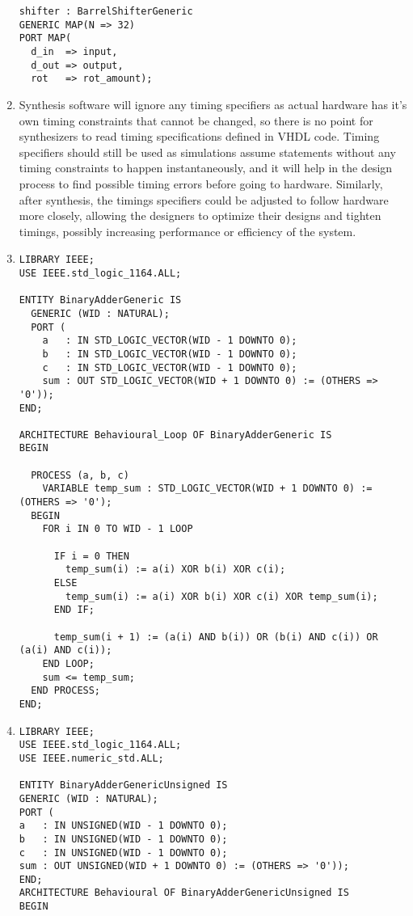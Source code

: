 \documentclass{article}
\begin{document}
\begin{enumerate}
        \begin{verbatim}
shifter : BarrelShifterGeneric
GENERIC MAP(N => 32)
PORT MAP(
  d_in  => input,
  d_out => output,
  rot   => rot_amount);
            \end{verbatim}

  \item Synthesis software will ignore any timing specifiers as actual hardware has it's own timing constraints that cannot be changed, so there is no point for synthesizers to read timing specifications defined in VHDL code.
        Timing specifiers should still be used as simulations assume statements without any timing constraints to happen instantaneously, and it will help in the design process to find possible timing errors before going to hardware.
        Similarly, after synthesis, the timings specifiers could be adjusted to follow hardware more closely, allowing the designers to optimize their designs and tighten timings, possibly increasing performance or efficiency of the system.

  \item \begin{verbatim}
LIBRARY IEEE;
USE IEEE.std_logic_1164.ALL;

ENTITY BinaryAdderGeneric IS
  GENERIC (WID : NATURAL);
  PORT (
    a   : IN STD_LOGIC_VECTOR(WID - 1 DOWNTO 0);
    b   : IN STD_LOGIC_VECTOR(WID - 1 DOWNTO 0);
    c   : IN STD_LOGIC_VECTOR(WID - 1 DOWNTO 0);
    sum : OUT STD_LOGIC_VECTOR(WID + 1 DOWNTO 0) := (OTHERS => '0'));
END;

ARCHITECTURE Behavioural_Loop OF BinaryAdderGeneric IS
BEGIN

  PROCESS (a, b, c)
    VARIABLE temp_sum : STD_LOGIC_VECTOR(WID + 1 DOWNTO 0) := (OTHERS => '0');
  BEGIN
    FOR i IN 0 TO WID - 1 LOOP

      IF i = 0 THEN
        temp_sum(i) := a(i) XOR b(i) XOR c(i);
      ELSE
        temp_sum(i) := a(i) XOR b(i) XOR c(i) XOR temp_sum(i);
      END IF;

      temp_sum(i + 1) := (a(i) AND b(i)) OR (b(i) AND c(i)) OR (a(i) AND c(i));
    END LOOP;
    sum <= temp_sum;
  END PROCESS;
END;
  \end{verbatim}

  \item  \begin{verbatim}
LIBRARY IEEE;
USE IEEE.std_logic_1164.ALL;
USE IEEE.numeric_std.ALL;

ENTITY BinaryAdderGenericUnsigned IS
GENERIC (WID : NATURAL);
PORT (
a   : IN UNSIGNED(WID - 1 DOWNTO 0);
b   : IN UNSIGNED(WID - 1 DOWNTO 0);
c   : IN UNSIGNED(WID - 1 DOWNTO 0);
sum : OUT UNSIGNED(WID + 1 DOWNTO 0) := (OTHERS => '0'));
END;
ARCHITECTURE Behavioural OF BinaryAdderGenericUnsigned IS
BEGIN


\end{verbatim}
\end{enumerate}
\end{document}
